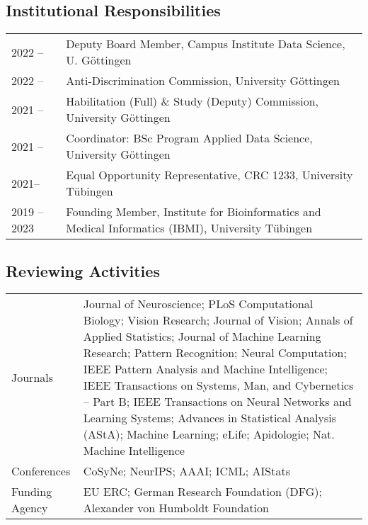 \documentclass[COG,11pt]{ercgrant}
\begin{document}
\subsection{Institutional Responsibilities}
\begin{tabular}{p{3cm}p{12cm}}
2022 -- & Deputy Board Member, Campus Institute Data Science, U. Göttingen\\
2022 -- & Anti-Discrimination Commission, University Göttingen\\
2021 -- & Habilitation (Full) \& Study (Deputy) Commission, University Göttingen\\
2021 -- & Coordinator: BSc Program Applied Data Science, University Göttingen\\
2021-- & Equal Opportunity Representative, CRC 1233, University T{\"u}bingen\\
2019 -- 2023 & Founding Member, Institute for Bioinformatics and Medical Informatics (IBMI), University T{\"u}bingen \\
\end{tabular}

\subsection{Reviewing Activities}
\begin{tabular}{p{3cm}p{12cm}}
Journals & Journal of Neuroscience; PLoS Computational Biology; Vision Research; Journal of Vision; Annals of Applied Statistics; Journal of Machine Learning Research; Pattern Recognition; Neural Computation; IEEE Pattern Analysis and Machine Intelligence; IEEE Transactions on Systems, Man, and Cybernetics – Part B; IEEE Transactions on Neural Networks and Learning Systems; Advances in Statistical Analysis (AStA); Machine Learning; eLife; Apidologie; Nat. Machine Intelligence\\
Conferences & CoSyNe; NeurIPS; AAAI; ICML; AIStats\\
Funding Agency & EU ERC; German Research Foundation (DFG); Alexander von Humboldt Foundation\\
\end{tabular}
\end{document}
